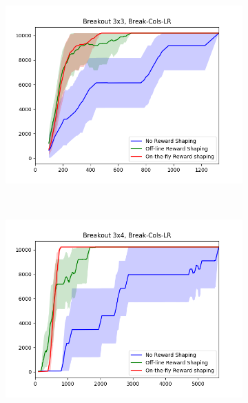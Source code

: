 \begin{figure}[h]
	\centering
	\begin{subfigure}[b]{0.3\textwidth}
		\includegraphics[width=\textwidth]{images/rs-comparison_b33.png}
	\end{subfigure}
	~ %
	\begin{subfigure}[b]{0.3\textwidth}
		\includegraphics[width=\textwidth]{images/rs-comparison_b34.png}
	\end{subfigure}
	~ %

\end{figure}
